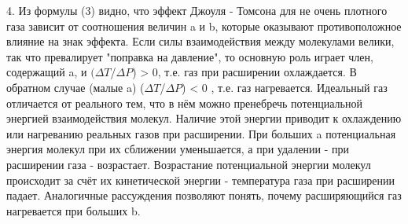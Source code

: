 \documentclass[a4paper]{article}
\begin{document}
	4. Из формулы (3) видно, что эффект Джоуля - Томсона для не очень плотного газа зависит от соотношения величин a и b, которые оказывают противоположное влияние на знак эффекта. Если силы взаимодействия между молекулами велики, так что превалирует "поправка на давление", то основную роль играет член, содержащий a, и $(\Delta T$/$\Delta P$) > 0, т.е. газ при расширении охлаждается. В обратном случае (малые a) ($\Delta T$/$\Delta P$) < 0 , т.е. газ нагревается. Идеальный газ отличается от реального тем, что в нём можно пренебречь потенциальной энергией взаимодействия молекул. Наличие этой энергии приводит к охлаждению или нагреванию реальных газов при расширении. При больших a потенциальная энергия молекул при их сближении уменьшается, а при удалении - при расширении газа - возрастает. Возрастание потенциальной энергии молекул происходит за счёт их кинетической энергии - температура газа при расширении падает. Аналогичные рассуждения позволяют понять, почему расширяющийся газ нагревается при больших b.
\end{document}
